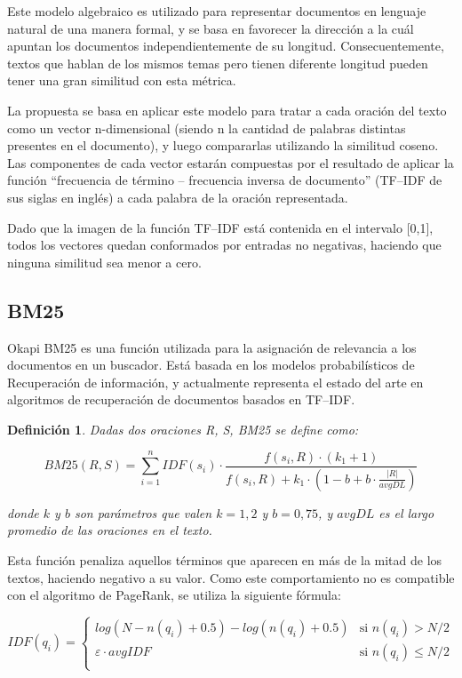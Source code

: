 \documentclass{llncs}
\newtheorem{definicion}{Definición}
\begin{document}
Este modelo algebraico es utilizado para representar documentos en lenguaje natural de una manera formal, y se basa en favorecer la dirección a la cuál apuntan los documentos independientemente de su longitud. Consecuentemente, textos que hablan de los mismos temas pero tienen diferente longitud pueden tener una gran similitud con esta métrica. 

La propuesta se basa en aplicar este modelo para tratar a cada oración del texto como un vector n-dimensional (siendo n la cantidad de palabras distintas presentes en el documento), y luego compararlas utilizando la similitud coseno. Las componentes de cada vector estarán compuestas por el resultado de aplicar la función “frecuencia de término -- frecuencia inversa de documento” (TF--IDF de sus siglas en inglés) a cada palabra de la oración representada.

Dado que la imagen de la función TF--IDF está contenida en el intervalo [0,1], todos los vectores quedan conformados por entradas no negativas, haciendo que ninguna similitud sea menor a cero. 

\subsection{BM25}
Okapi BM25 es una función utilizada para la asignación de relevancia a los documentos en un buscador.
Está basada en los modelos probabilísticos de Recuperación de información, y actualmente 
representa el estado del arte en algoritmos de recuperación de documentos basados en TF--IDF.

\begin{definicion}
Dadas dos oraciones R, S, BM25 se define como:

\begin{equation}
BM25(R,S) = \sum_{i=1}^{n} IDF(s_i) \cdot \frac{f(s_i, R) \cdot (k_1 + 1)}{f(s_i, R) + k_1 \cdot (1 - b + b \cdot \frac{|R|}{avgDL})}
\end{equation}

donde $k$ y $b$ son parámetros que valen $k = 1,2$ y $b = 0,75$, y $avgDL$ es el largo promedio de las oraciones en el texto.
\end{definicion}

Esta función penaliza aquellos términos que aparecen en más de la mitad de los textos, haciendo negativo a su valor. 
Como este comportamiento no es compatible con el algoritmo de PageRank, se utiliza la siguiente fórmula:
                
\begin{equation}
 IDF(q_i) =
  \begin{cases}
       log(N - n(q_i) + 0.5) - log(n(q_i) + 0.5)    & \text{si }  n(q_i) > N/2\\
       \varepsilon \cdot avgIDF                     & \text{si }  n(q_i) \leq N/2\\
  \end{cases}
\end{equation}                
                
\end{document}
